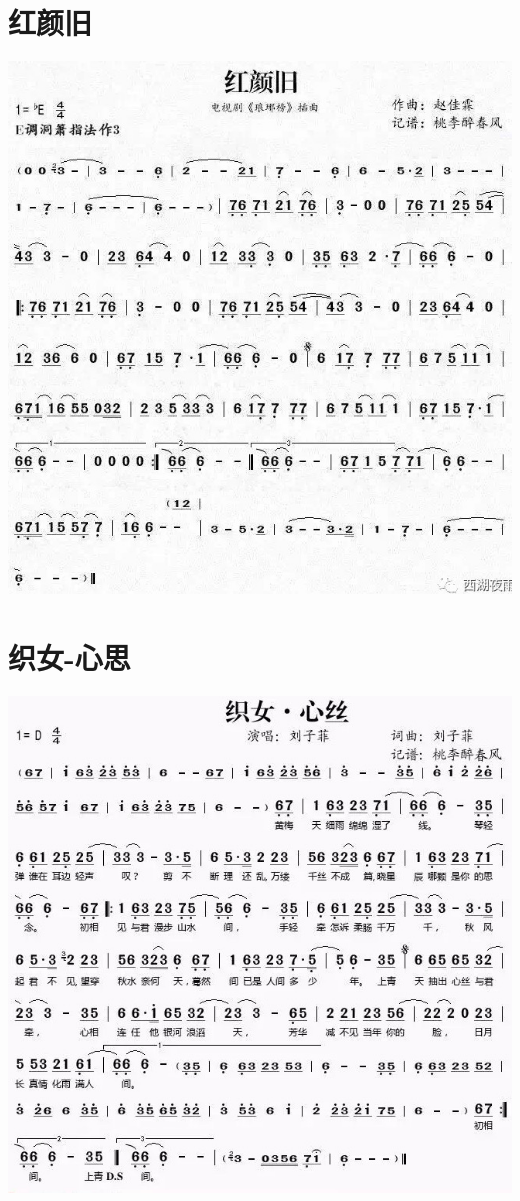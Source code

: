 \documentclass[cn,pad,twocol]{elegantbook}
\begin{document}
\section{红颜旧}\includegraphics[width=\textwidth]{dongxiao/20200819/红颜旧.jpeg}
\section{织女-心思}\includegraphics[width=\textwidth]{dongxiao/20200819/织女-心思.jpeg}
\end{document}
